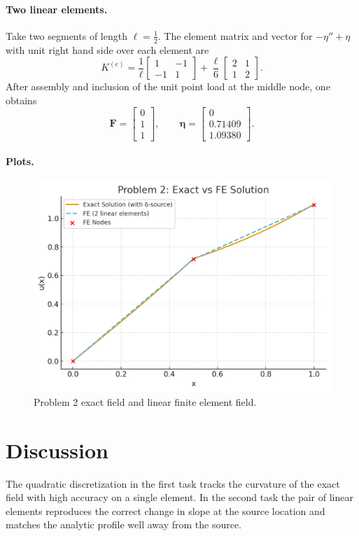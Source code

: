 \paragraph{Two linear elements.}
Take two segments of length \(\ell=\tfrac12\). The element matrix and vector for \(−\eta''+\eta\) with unit right hand side over each element are
\[
K^{(e)}=\frac{1}{\ell}
\begin{bmatrix}
1&−1\\
−1&1
\end{bmatrix}
+\frac{\ell}{6}
\begin{bmatrix}
2&1\\
1&2
\end{bmatrix}.
\]
After assembly and inclusion of the unit point load at the middle node, one obtains
\[
\boldsymbol{F}=\begin{bmatrix}0\\1\\1\end{bmatrix},
\qquad
\boldsymbol{\eta}=
\begin{bmatrix}
0\\[2pt]
0.71409\\[2pt]
1.09380
\end{bmatrix}.
\]

\paragraph{Plots.}
\begin{figure}[H]
  \centering
  \includegraphics[width=0.7\linewidth]{hw3_prob2.png}
  \caption{Problem 2 exact field and linear finite element field.}
\end{figure}

\section*{Discussion}
The quadratic discretization in the first task tracks the curvature of the exact field with high accuracy on a single element. In the second task the pair of linear elements reproduces the correct change in slope at the source location and matches the analytic profile well away from the source.
